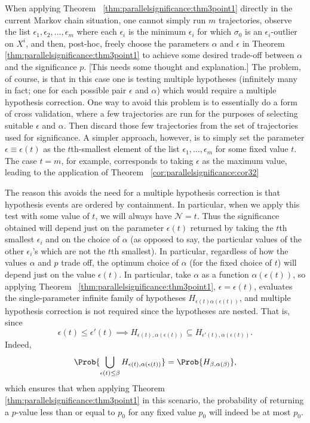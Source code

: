 \documentclass[12pt]{article}
\begin{document}
When applying Theorem~%
\ref{thm:parallelsignificance:thm3point1} directly in the current Markov
chain situation, one cannot simply run \( m \) trajectories, observe the
list \( \epsilon_1 , \epsilon_2, \dots, \epsilon_ m \) where each \(
\epsilon_i \) is the minimum \( \epsilon_i \) for which \( \sigma_0 \)
is an \( \epsilon_i \)-outlier on \( X^i \), and then, post-hoc, freely
choose the parameters \( \alpha \) and \( \epsilon \) in Theorem~%
\ref{thm:parallelsignificance:thm3point1} to achieve some desired
trade-off between \( \alpha \) and the significance \( p \).  [This
needs some thought and explanation.] The problem, of course, is that in
this case one is testing multiple hypotheses (infinitely many in fact;
one for each possible pair \( \epsilon \) and \( \alpha \)) which would
require a multiple hypothesis correction.  One way to avoid this problem
is to essentially do a form of cross validation, where a few
trajectories are run for the purposes of selecting suitable \( \epsilon \)
and \( \alpha \). Then discard those few trajectories from the set of
trajectories used for significance.  A simpler approach, however, is to
simply set the parameter \( \epsilon \equiv \epsilon(t) \) as the \( t \)th-smallest
element of the list \( \epsilon_1, \dots, \epsilon_m \) for some fixed
value \( t \).  The case \( t = m \), for example, corresponds to taking
\( \epsilon \) as the maximum value, leading to the application of
Theorem~%
\ref{cor:parallelsignificance:cor32}

The reason this avoids the need for a multiple hypothesis correction is
that hypothesis events are ordered by containment.  In particular, when
we apply this test with some value of \( t \), we will always have \(
\mathcal{N} = t \).  Thus the significance obtained will depend just on
the parameter \( \epsilon(t) \) returned by taking the \( t \)th
smallest \( \epsilon_i \) and on the choice of \( \alpha \) (as opposed
to say, the particular values of the other \( \epsilon_i \)'s which are
not the \( t \)th smallest).  In particular, regardless of how the
values \( \alpha \) and \( p \) trade off, the optimum choice of \(
\alpha \) (for the fixed choice of \( t \)) will depend just on the
value \( \epsilon(t) \).  In particular, take \( \alpha \) as a function
\( \alpha(\epsilon(t) ) \), so applying Theorem~%
\ref{thm:parallelsignificance:thm3point1}, \( \epsilon = \epsilon(t) \),
evaluates the single-parameter infinite family of hypotheses \( H_{\epsilon
(t) \alpha(\epsilon(t)) } \), and multiple hypothesis correction is not
required since the hypotheses are nested.  That is, since
\[
    \epsilon(t) \le \epsilon' (t) \implies H_{\epsilon(t),\alpha(\epsilon
    (t) )} \subseteq H_{\epsilon' (t) ,\alpha(\epsilon(t) )}.
\] Indeed,
\[
    \Prob{ \bigcup_{\epsilon(t) \le \beta } H_{\epsilon(t) ,\alpha(\epsilon
    (t))} } = \Prob{H_{\beta, \alpha(\beta)}},
\] which ensures that when applying Theorem~%
\ref{thm:parallelsignificance:thm3point1} in this scenario, the
probability of returning a \( p \)-value less than or equal to \( p_0 \)
for any fixed value \( p_0 \) will indeed be at most \( p_0 \).
\end{document}
